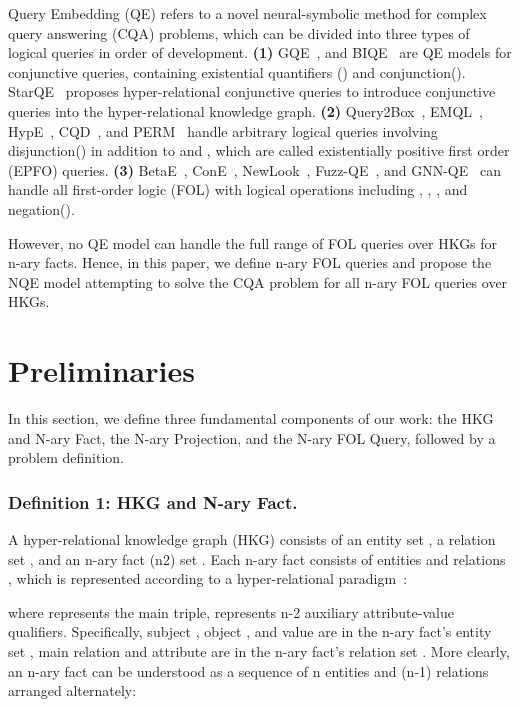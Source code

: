 \documentclass[letterpaper]{article} \usepackage{aaai23}  \usepackage{times}  \usepackage{helvet}  \usepackage{courier}  \usepackage[hyphens]{url}  \usepackage{graphicx} \urlstyle{rm} \def\UrlFont{\rm}  \usepackage{natbib}  \usepackage{caption} \frenchspacing  \setlength{\pdfpagewidth}{8.5in}  \setlength{\pdfpageheight}{11in}  \usepackage{algorithm}
\begin{document}
Query Embedding (QE) refers to a novel neural-symbolic method for complex query answering (CQA) problems, which can be divided into three types of logical queries in order of development. \textbf{(1)} GQE~\citep{GQE}, and BIQE~\citep{BIQE} are QE models for conjunctive queries, containing existential quantifiers () and conjunction(). StarQE~\citep{StarQE} proposes hyper-relational conjunctive queries to introduce conjunctive queries into the hyper-relational knowledge graph. \textbf{(2)} Query2Box~\citep{Q2B}, EMQL~\citep{EMQL}, HypE~\citep{HypE}, CQD~\citep{CQD}, and PERM~\citep{PERM} handle arbitrary logical queries involving disjunction() in addition to  and , which are called existentially positive first order (EPFO) queries. \textbf{(3)} BetaE~\citep{BetaE}, ConE~\citep{ConE}, NewLook~\citep{NewLook}, Fuzz-QE~\citep{FuzzQE}, and GNN-QE~\citep{GNN-QE} can handle all first-order logic (FOL) with logical operations including , , , and negation().

However, no QE model can handle the full range of FOL queries over HKGs for n-ary facts. Hence, in this paper, we define n-ary FOL queries and propose the NQE model attempting to solve the CQA problem for all n-ary FOL queries over HKGs.

\section{Preliminaries}
\label{s3}

In this section, we define three fundamental components of our work: the HKG and N-ary Fact, the N-ary Projection, and the N-ary FOL Query, followed by a problem definition.

\subsubsection{Definition 1: HKG and N-ary Fact.} 
A hyper-relational knowledge graph (HKG)
 consists of an entity set , a relation set , and an n-ary fact (n2) set . Each n-ary fact  consists of entities  and relations , which is represented according to a hyper-relational paradigm~\citep{HINGE}:

where  represents the main triple,  represents n-2 auxiliary attribute-value qualifiers. Specifically, subject , object , and value  are in the n-ary fact's entity set , main relation  and attribute  are in the n-ary fact's relation set . More clearly, an n-ary fact can be understood as a sequence of n entities and (n-1) relations arranged alternately:
\end{document}

